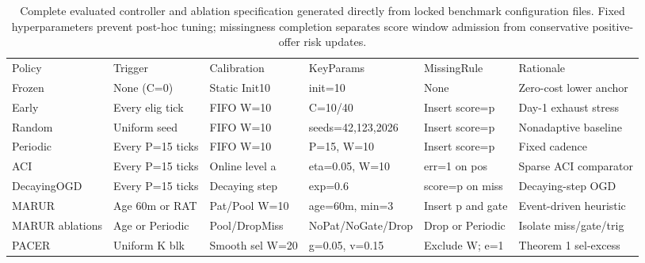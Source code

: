 \begin{table}[!ht]
\centering\footnotesize\setlength{\tabcolsep}{4pt}
\caption{Complete evaluated controller and ablation specification generated directly from locked benchmark configuration files. Fixed hyperparameters prevent post-hoc tuning; missingness completion separates score window admission from conservative positive-offer risk updates.}
\begin{tabular}{llllll}
\hline
Policy & Trigger & Calibration & KeyParams & MissingRule & Rationale \\
Frozen & None (C=0) & Static Init10 & init=10 & None & Zero-cost lower anchor \\
Early & Every elig tick & FIFO W=10 & C=10/40 & Insert score=p & Day-1 exhaust stress \\
Random & Uniform seed & FIFO W=10 & seeds=42,123,2026 & Insert score=p & Nonadaptive baseline \\
Periodic & Every P=15 ticks & FIFO W=10 & P=15, W=10 & Insert score=p & Fixed cadence \\
ACI & Every P=15 ticks & Online level a & eta=0.05, W=10 & err=1 on pos & Sparse ACI comparator \\
DecayingOGD & Every P=15 ticks & Decaying step & exp=0.6 & score=p on miss & Decaying-step OGD \\
MARUR & Age 60m or RAT & Pat/Pool W=10 & age=60m, min=3 & Insert p and gate & Event-driven heuristic \\
MARUR ablations & Age or Periodic & Pool/DropMiss & NoPat/NoGate/Drop & Drop or Periodic & Isolate miss/gate/trig \\
PACER & Uniform K blk & Smooth sel W=20 & g=0.05, v=0.15 & Exclude W; e=1 & Theorem 1 sel-excess \\
\hline
\end{tabular}
\end{table}
